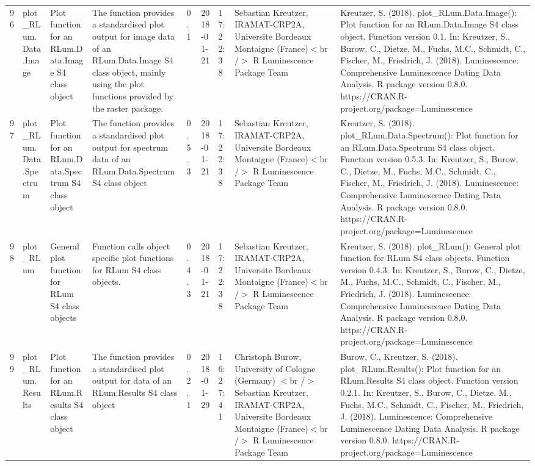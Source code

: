 \begin{table}[ht]
\begin{tabular}{rllllllll}
 \\ 
  96 & plot\_RLum.Data.Image & Plot function for an  RLum.Data.Image  S4 class object & The function provides a standardised plot output for image data of an RLum.Data.Image S4 class object, mainly using the plot functions provided by the  raster  package. & 0.1 & 2018-01-21 & 17:22:38
 & Sebastian Kreutzer, IRAMAT-CRP2A, Universite Bordeaux Montaigne (France)$<$br /$>$  R Luminescence Package Team & Kreutzer, S. (2018). plot\_RLum.Data.Image(): Plot function for an RLum.Data.Image S4 class object. Function version 0.1. In: Kreutzer, S., Burow, C., Dietze, M., Fuchs, M.C., Schmidt, C., Fischer, M., Friedrich, J. (2018). Luminescence: Comprehensive Luminescence Dating Data Analysis. R package version 0.8.0. https://CRAN.R-project.org/package=Luminescence
 \\ 
  97 & plot\_RLum.Data.Spectrum & Plot function for an RLum.Data.Spectrum S4 class object & The function provides a standardised plot output for spectrum data of an RLum.Data.Spectrum S4 class object & 0.5.3 & 2018-01-21 & 17:22:38
 & Sebastian Kreutzer, IRAMAT-CRP2A, Universite Bordeaux Montaigne (France)$<$br /$>$  R Luminescence Package Team & Kreutzer, S. (2018). plot\_RLum.Data.Spectrum(): Plot function for an RLum.Data.Spectrum S4 class object. Function version 0.5.3. In: Kreutzer, S., Burow, C., Dietze, M., Fuchs, M.C., Schmidt, C., Fischer, M., Friedrich, J. (2018). Luminescence: Comprehensive Luminescence Dating Data Analysis. R package version 0.8.0. https://CRAN.R-project.org/package=Luminescence
 \\ 
  98 & plot\_RLum & General plot function for RLum S4 class objects & Function calls object specific plot functions for RLum S4 class objects. & 0.4.3 & 2018-01-21 & 17:22:38
 & Sebastian Kreutzer, IRAMAT-CRP2A, Universite Bordeaux Montaigne (France)$<$br /$>$  R Luminescence Package Team & Kreutzer, S. (2018). plot\_RLum(): General plot function for RLum S4 class objects. Function version 0.4.3. In: Kreutzer, S., Burow, C., Dietze, M., Fuchs, M.C., Schmidt, C., Fischer, M., Friedrich, J. (2018). Luminescence: Comprehensive Luminescence Dating Data Analysis. R package version 0.8.0. https://CRAN.R-project.org/package=Luminescence
 \\ 
  99 & plot\_RLum.Results & Plot function for an RLum.Results S4 class object & The function provides a standardised plot output for data of an RLum.Results S4 class object & 0.2.1 & 2018-01-29 & 16:27:41
 & Christoph Burow, University of Cologne (Germany)  $<$br /$>$ Sebastian Kreutzer, IRAMAT-CRP2A, Universite Bordeaux Montaigne (France)$<$br /$>$  R Luminescence Package Team & Burow, C., Kreutzer, S. (2018). plot\_RLum.Results(): Plot function for an RLum.Results S4 class object. Function version 0.2.1. In: Kreutzer, S., Burow, C., Dietze, M., Fuchs, M.C., Schmidt, C., Fischer, M., Friedrich, J. (2018). Luminescence: Comprehensive Luminescence Dating Data Analysis. R package version 0.8.0. https://CRAN.R-project.org/package=Luminescence

\end{tabular}
\end{table}
